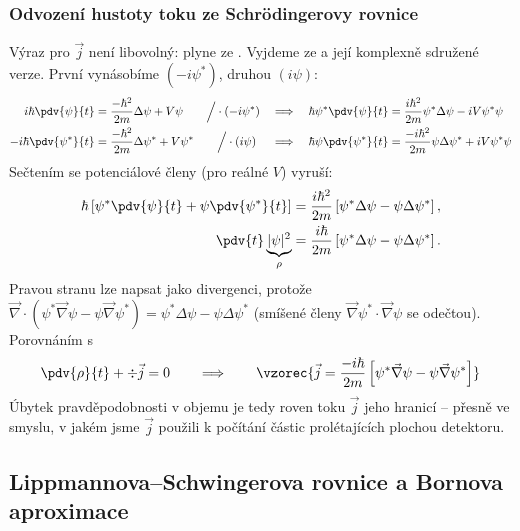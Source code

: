 \subsubsection*{Odvození hustoty toku ze Schrödingerovy rovnice}
Výraz pro $\vec j$ není libovolný: plyne ze . Vyjdeme ze  a její komplexně sdružené verze. První vynásobíme $(-i\psi^*)$, druhou $(i\psi)$:
\begin{align}
  i\hbar\pdv{\psi}{t} &= \frac{-\hbar^2}{2m}\Delta\psi + V\psi \qquad \Big/\cdot(-i\psi^*)
  &&\Longrightarrow\quad \hbar\psi^*\pdv{\psi}{t} = \frac{i\hbar^2}{2m}\psi^*\Delta\psi - iV\psi^*\psi \\
  -i\hbar\pdv{\psi^*}{t} &= \frac{-\hbar^2}{2m}\Delta\psi^* + V\psi^* \qquad \Big/\cdot(i\psi)
  &&\Longrightarrow\quad \hbar\psi\pdv{\psi^*}{t} = \frac{-i\hbar^2}{2m}\psi\Delta\psi^* + iV\psi^*\psi
\end{align}
Sečtením se potenciálové členy (pro reálné $V$) vyruší:
\begin{align}
  \hbar\left[\psi^*\pdv{\psi}{t} + \psi\pdv{\psi^*}{t}\right] &= \frac{i\hbar^2}{2m}\left[\psi^*\Delta\psi - \psi\Delta\psi^*\right],\\
  \pdv{t}\underbrace{|\psi|^2}_{\rho} &= \frac{i\hbar}{2m}\left[\psi^*\Delta\psi - \psi\Delta\psi^*\right].
\end{align}
Pravou stranu lze napsat jako divergenci, protože $\vec\nabla\cdot(\psi^*\vec\nabla\psi - \psi\vec\nabla\psi^*) = \psi^*\Delta\psi - \psi\Delta\psi^*$ (smíšené členy $\vec\nabla\psi^*\cdot\vec\nabla\psi$ se odečtou). Porovnáním s 
\begin{equation}
  \pdv{\rho}{t} + \div\vec j = 0
  \qquad\Longrightarrow\qquad
  \vzorec{\vec j = \frac{-i\hbar}{2m}\left[\psi^*\vec\nabla\psi - \psi\vec\nabla\psi^*\right]}
\end{equation}
Úbytek pravděpodobnosti v objemu je tedy roven toku $\vec j$ jeho hranicí -- přesně ve smyslu, v jakém jsme $\vec j$ použili k počítání částic prolétajících plochou detektoru.

\subsection{Lippmannova--Schwingerova rovnice a Bornova aproximace}

